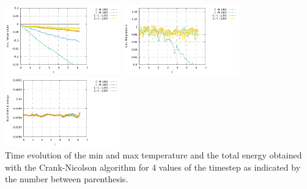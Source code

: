 \begin{center}
\includegraphics[width=5cm]{python_codes/fieldstone_43/images/Tmin_CN.pdf}
\includegraphics[width=5cm]{python_codes/fieldstone_43/images/Tmax_CN.pdf}
\includegraphics[width=5cm]{python_codes/fieldstone_43/images/ET_CN.pdf}\\
{\small Time evolution of the min and max temperature and the total energy obtained with the Crank-Nicolson algorithm for 4 values of the timestep as indicated by the number between parenthesis.}
\end{center}


